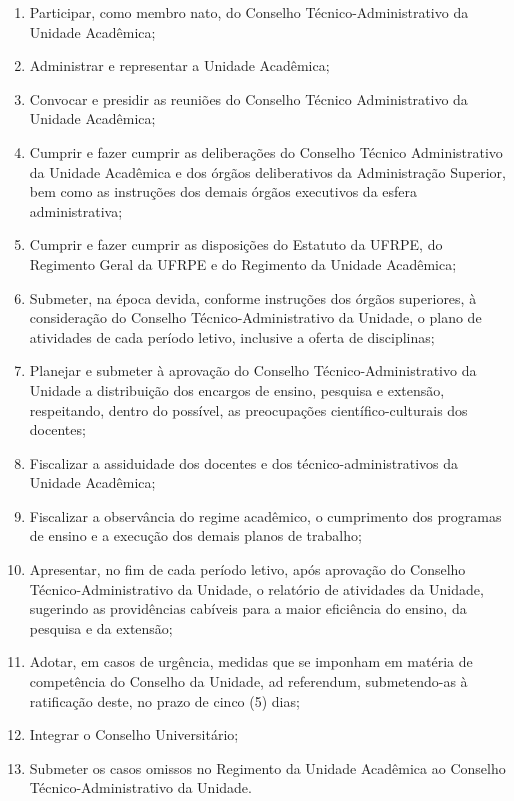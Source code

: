 \documentclass[
	12pt,				%
	openright,			%
  oneside,     %
	a4paper,			%
 hyphens,
	chapter=TITLE,		%
	english,			%
	french,				%
	spanish,			%
	brazil				%
	]{abntex2}
\begin{document}
\begin{enumerate}
    \item Participar, como membro nato, do Conselho Técnico-Administrativo da Unidade Acadêmica;
    \item Administrar e representar a Unidade Acadêmica;
    \item Convocar e presidir as reuniões do Conselho Técnico Administrativo da Unidade Acadêmica;
    \item Cumprir e fazer cumprir as deliberações do Conselho Técnico Administrativo da Unidade Acadêmica e dos órgãos deliberativos da Administração Superior, 	bem como as instruções dos demais órgãos executivos da esfera administrativa;
    \item Cumprir e fazer cumprir as 	disposições do Estatuto da UFRPE, do Regimento Geral da UFRPE e do 	Regimento da Unidade Acadêmica;
    \item Submeter, na época devida, 	conforme instruções dos órgãos superiores, à consideração do Conselho Técnico-Administrativo da Unidade, o plano de atividades de cada período letivo, inclusive a oferta de disciplinas;
    \item Planejar e submeter à aprovação do Conselho Técnico-Administrativo da Unidade a distribuição dos encargos de ensino, pesquisa e extensão, respeitando, dentro do possível, as preocupações científico-culturais dos docentes;
    \item Fiscalizar a assiduidade dos docentes e dos técnico-administrativos da Unidade Acadêmica; 	
    \item Fiscalizar a observância do 	regime acadêmico, o cumprimento dos programas de ensino e a execução dos demais planos de trabalho;
    \item Apresentar, no fim de cada período letivo, após aprovação do Conselho Técnico-Administrativo da Unidade, o relatório de atividades da Unidade, sugerindo as providências cabíveis para a maior 	eficiência do ensino, da pesquisa e da extensão;
    \item Adotar, em casos de urgência, medidas que se imponham em matéria de competência do Conselho da 	Unidade, ad referendum, submetendo-as à ratificação deste, no prazo de cinco (5) dias;
    \item Integrar o Conselho Universitário;
    \item Submeter os casos omissos no Regimento da Unidade Acadêmica ao Conselho Técnico-Administrativo da Unidade.
\end{enumerate}
\end{document}
